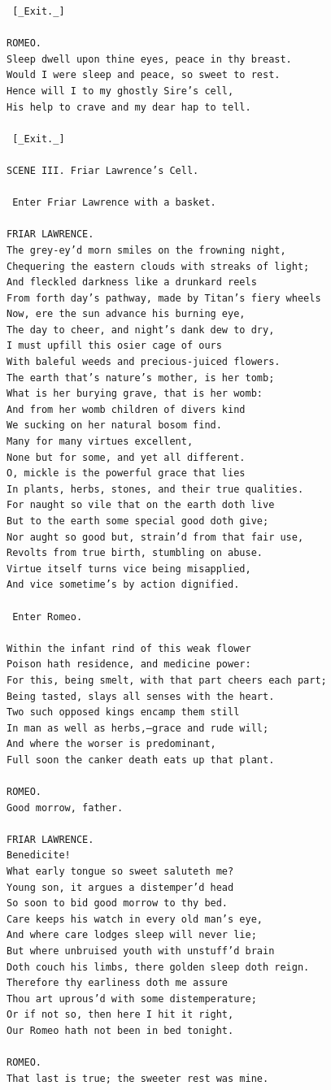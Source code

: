 \documentclass{article}
\begin{document}
\begin{verbatim}
 [_Exit._]

ROMEO.
Sleep dwell upon thine eyes, peace in thy breast.
Would I were sleep and peace, so sweet to rest.
Hence will I to my ghostly Sire’s cell,
His help to crave and my dear hap to tell.

 [_Exit._]

SCENE III. Friar Lawrence’s Cell.

 Enter Friar Lawrence with a basket.

FRIAR LAWRENCE.
The grey-ey’d morn smiles on the frowning night,
Chequering the eastern clouds with streaks of light;
And fleckled darkness like a drunkard reels
From forth day’s pathway, made by Titan’s fiery wheels
Now, ere the sun advance his burning eye,
The day to cheer, and night’s dank dew to dry,
I must upfill this osier cage of ours
With baleful weeds and precious-juiced flowers.
The earth that’s nature’s mother, is her tomb;
What is her burying grave, that is her womb:
And from her womb children of divers kind
We sucking on her natural bosom find.
Many for many virtues excellent,
None but for some, and yet all different.
O, mickle is the powerful grace that lies
In plants, herbs, stones, and their true qualities.
For naught so vile that on the earth doth live
But to the earth some special good doth give;
Nor aught so good but, strain’d from that fair use,
Revolts from true birth, stumbling on abuse.
Virtue itself turns vice being misapplied,
And vice sometime’s by action dignified.

 Enter Romeo.

Within the infant rind of this weak flower
Poison hath residence, and medicine power:
For this, being smelt, with that part cheers each part;
Being tasted, slays all senses with the heart.
Two such opposed kings encamp them still
In man as well as herbs,—grace and rude will;
And where the worser is predominant,
Full soon the canker death eats up that plant.

ROMEO.
Good morrow, father.

FRIAR LAWRENCE.
Benedicite!
What early tongue so sweet saluteth me?
Young son, it argues a distemper’d head
So soon to bid good morrow to thy bed.
Care keeps his watch in every old man’s eye,
And where care lodges sleep will never lie;
But where unbruised youth with unstuff’d brain
Doth couch his limbs, there golden sleep doth reign.
Therefore thy earliness doth me assure
Thou art uprous’d with some distemperature;
Or if not so, then here I hit it right,
Our Romeo hath not been in bed tonight.

ROMEO.
That last is true; the sweeter rest was mine.


\end{verbatim}
\end{document}
